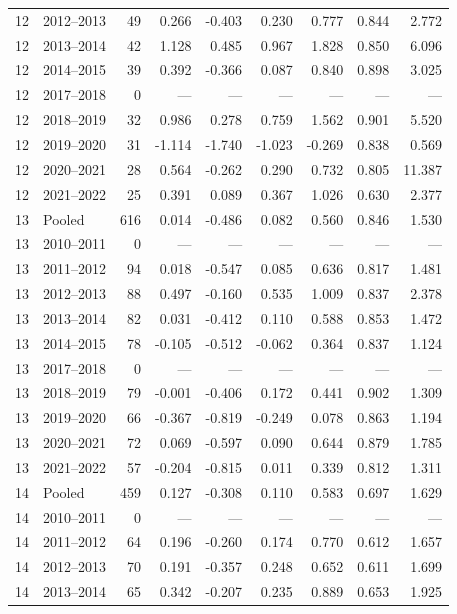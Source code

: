 \begin{longtable}{llrrrrrrr}
12 & 2012--2013 & 49 & 0.266 & -0.403 & 0.230 & 0.777 & 0.844 & 2.772 \\
12 & 2013--2014 & 42 & 1.128 & 0.485 & 0.967 & 1.828 & 0.850 & 6.096 \\
12 & 2014--2015 & 39 & 0.392 & -0.366 & 0.087 & 0.840 & 0.898 & 3.025 \\
12 & 2017--2018 & 0 & --- & --- & --- & --- & --- & --- \\
12 & 2018--2019 & 32 & 0.986 & 0.278 & 0.759 & 1.562 & 0.901 & 5.520 \\
12 & 2019--2020 & 31 & -1.114 & -1.740 & -1.023 & -0.269 & 0.838 & 0.569 \\
12 & 2020--2021 & 28 & 0.564 & -0.262 & 0.290 & 0.732 & 0.805 & 11.387 \\
12 & 2021--2022 & 25 & 0.391 & 0.089 & 0.367 & 1.026 & 0.630 & 2.377 \\
13 & Pooled & 616 & 0.014 & -0.486 & 0.082 & 0.560 & 0.846 & 1.530 \\
13 & 2010--2011 & 0 & --- & --- & --- & --- & --- & --- \\
13 & 2011--2012 & 94 & 0.018 & -0.547 & 0.085 & 0.636 & 0.817 & 1.481 \\
13 & 2012--2013 & 88 & 0.497 & -0.160 & 0.535 & 1.009 & 0.837 & 2.378 \\
13 & 2013--2014 & 82 & 0.031 & -0.412 & 0.110 & 0.588 & 0.853 & 1.472 \\
13 & 2014--2015 & 78 & -0.105 & -0.512 & -0.062 & 0.364 & 0.837 & 1.124 \\
13 & 2017--2018 & 0 & --- & --- & --- & --- & --- & --- \\
13 & 2018--2019 & 79 & -0.001 & -0.406 & 0.172 & 0.441 & 0.902 & 1.309 \\
13 & 2019--2020 & 66 & -0.367 & -0.819 & -0.249 & 0.078 & 0.863 & 1.194 \\
13 & 2020--2021 & 72 & 0.069 & -0.597 & 0.090 & 0.644 & 0.879 & 1.785 \\
13 & 2021--2022 & 57 & -0.204 & -0.815 & 0.011 & 0.339 & 0.812 & 1.311 \\
14 & Pooled & 459 & 0.127 & -0.308 & 0.110 & 0.583 & 0.697 & 1.629 \\
14 & 2010--2011 & 0 & --- & --- & --- & --- & --- & --- \\
14 & 2011--2012 & 64 & 0.196 & -0.260 & 0.174 & 0.770 & 0.612 & 1.657 \\
14 & 2012--2013 & 70 & 0.191 & -0.357 & 0.248 & 0.652 & 0.611 & 1.699 \\
14 & 2013--2014 & 65 & 0.342 & -0.207 & 0.235 & 0.889 & 0.653 & 1.925 \\

\end{longtable}
